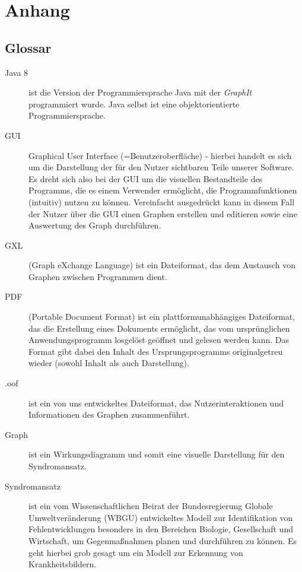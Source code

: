 \documentclass[enabledeprecatedfontcommands,fontsize=11pt,paper=a4,twoside]{scrartcl}
\newcounter{one}
\begin{document}
\clearpage
\section{Anhang} \label{sec:anhang}	



\subsection{Glossar}
\begin{description}
	\item[Java 8] ist die Version der Programmiersprache Java mit der \textit{GraphIt} programmiert wurde. Java selbst ist eine objektorientierte Programmiersprache. 
	\item[GUI] Graphical User Interface (=Benutzeroberfläche) - hierbei handelt es sich um die Darstellung der für den Nutzer sichtbaren Teile unserer Software. Es dreht sich also bei der GUI um die visuellen Bestandteile des Programms, die es einem Verwender ermöglicht, die Programmfunktionen (intuitiv) nutzen zu können. Vereinfacht ausgedrückt kann in diesem Fall der Nutzer über die GUI einen Graphen erstellen und editieren sowie eine Auswertung des Graph durchführen. 
	\item[GXL] (Graph eXchange Language) ist ein Dateiformat, das dem Austausch von Graphen zwischen Programmen dient. 
	\item[PDF] (Portable Document Format) ist ein plattformunabhängiges Dateiformat, das die Erstellung eines Dokuments ermöglicht, das vom ursprünglichen Anwendungsprogramm losgelöst geöffnet und gelesen werden kann. Das Format gibt dabei den Inhalt des Ursprungsprogramms originalgetreu wieder (sowohl Inhalt als auch Darstellung). 
	\item[.oof] ist ein von uns entwickeltes Dateiformat, das Nutzerinteraktionen und Informationen des Graphen zusammenführt. 
	\item[Graph] ist ein Wirkungsdiagramm und somit eine visuelle Darstellung für den Syndromansatz.  
	\item[\hypertarget{Syndromansatz}{Syndromansatz}] ist ein vom \glqq Wissenschaftlichen Beirat der Bundesregierung Globale Umweltveränderung \grqq{} (WBGU) entwickeltes Modell zur Identifikation von Fehlentwicklungen besonders in den Bereichen Biologie, Gesellschaft und Wirtschaft, um Gegenmaßnahmen planen und durchführen zu können. Es geht hierbei grob gesagt um ein Modell zur Erkennung von \glqq Krankheitsbildern\grqq.

\end{description}
\end{document}
